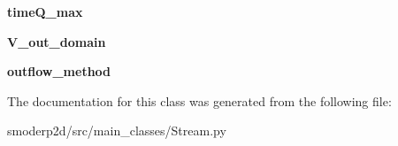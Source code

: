 \begin{DoxyCompactItemize}
\item 
\hypertarget{classsmoderp2d_1_1src_1_1main__classes_1_1Stream_1_1Reach_a2288c527275d3c1f29b4f9b4d7ba10ae}{{\bfseries time\-Q\-\_\-max}}\label{classsmoderp2d_1_1src_1_1main__classes_1_1Stream_1_1Reach_a2288c527275d3c1f29b4f9b4d7ba10ae}

\item 
\hypertarget{classsmoderp2d_1_1src_1_1main__classes_1_1Stream_1_1Reach_afa1bc9e1ee93bf29c4d2a1585a9ca800}{{\bfseries V\-\_\-out\-\_\-domain}}\label{classsmoderp2d_1_1src_1_1main__classes_1_1Stream_1_1Reach_afa1bc9e1ee93bf29c4d2a1585a9ca800}

\item 
\hypertarget{classsmoderp2d_1_1src_1_1main__classes_1_1Stream_1_1Reach_ae43e6508ba3aead29d195425d3b342c2}{{\bfseries outflow\-\_\-method}}\label{classsmoderp2d_1_1src_1_1main__classes_1_1Stream_1_1Reach_ae43e6508ba3aead29d195425d3b342c2}

\end{DoxyCompactItemize}


The documentation for this class was generated from the following file\-:\begin{DoxyCompactItemize}
\item 
smoderp2d/src/main\-\_\-classes/Stream.\-py\end{DoxyCompactItemize}
